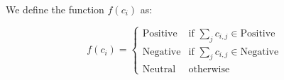 \begin{examplebox}
    We define the function $f(c_i)$ as:

    \begin{equation}
        f(c_i) = \begin{cases}
            \text{Positive} & \text{if } \sum_j c_{i,j} \in \text{Positive} \\
            \text{Negative} & \text{if } \sum_j c_{i,j} \in \text{Negative} \\
            \text{Neutral} & \text{otherwise}
        \end{cases}
    \end{equation}


\end{examplebox}

